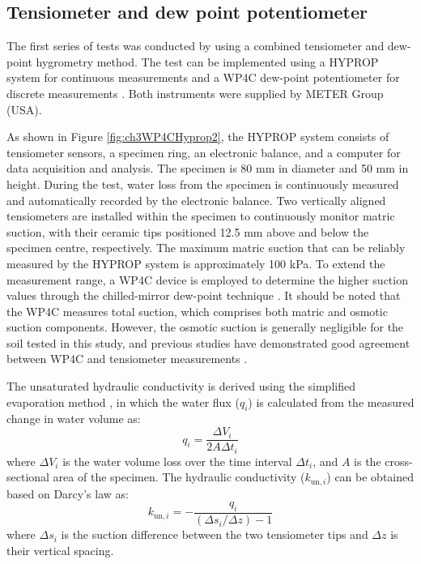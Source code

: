\subsection{Tensiometer and dew point potentiometer}
The first series of tests was conducted by using a combined tensiometer and dew-point hygrometry method. The test can be implemented using a HYPROP system for continuous measurements and a WP4C dew-point potentiometer for discrete measurements \parencite{singhEstimatingSoilWater2024, satyanagaMeasurementSoilwaterCharacteristic2019}. Both instruments were supplied by METER Group (USA).\par
As shown in Figure \ref{fig:ch3WP4CHyprop2}, the HYPROP system consists of tensiometer sensors, a specimen ring, an electronic balance, and a computer for data acquisition and analysis. The specimen is 80 mm in diameter and 50 mm in height. During the test, water loss from the specimen is continuously measured and automatically recorded by the electronic balance. Two vertically aligned tensiometers are installed within the specimen to continuously monitor matric suction, with their ceramic tips positioned 12.5 mm above and below the specimen centre, respectively. The maximum matric suction that can be reliably measured by the HYPROP system is approximately 100 kPa. To extend the measurement range, a WP4C device is employed to determine the higher suction values through the chilled-mirror dew-point technique \parencite{changWaterTransferGranite2026, shokranaMeasurementSoilWater2020}. It should be noted that the WP4C measures total suction, which comprises both matric and osmotic suction components. However, the osmotic suction is generally negligible for the soil tested in this study, and previous studies have demonstrated good agreement between WP4C and tensiometer measurements \parencite{aziziCouplingCyclicWater2023}. \par
The unsaturated hydraulic conductivity is derived using the simplified evaporation method \parencite{petersSimplifiedEvaporationMethod2008, schindlerSimplifyingEvaporationMethod2006}, in which the water flux ($q_i$) is calculated from the measured change in water volume as:
\begin{equation}
    q_i=\frac{\Delta V_i}{2A\Delta t_i}
\end{equation}
where $\Delta V_i$ is the water volume loss over the time interval $\Delta t_i$, and $A$ is the cross-sectional area of the specimen. The hydraulic conductivity ($k_{\mathrm{un,}i}$) can be obtained based on Darcy's law as:
\begin{equation}
    k_{\mathrm{un,}i}=-\frac{q_i}{(\Delta s_i/\Delta z)-1}
\end{equation}
where $\Delta s_i$ is the suction difference between the two tensiometer tips and $\Delta z$ is their vertical spacing.\par

